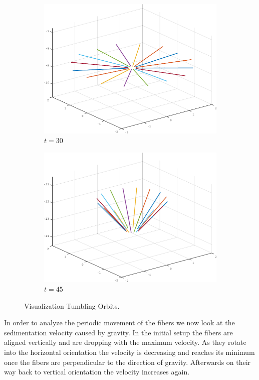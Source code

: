 \begin{figure}[!htbp]
\begin{subfigure}[h]{0.45\textwidth}
    \includegraphics[width=\textwidth]{img/ring_00030.pdf}
    \caption{$t=30$}\label{fig:ring_simulation_1c}
  \end{subfigure}
  \begin{subfigure}[h]{0.45\textwidth}
    \centering
    \includegraphics[width=\textwidth]{img/ring_00045.pdf}
    \caption{$t=45$}\label{fig:ring_simulation_1d}
  \end{subfigure}
  \caption{Visualization Tumbling Orbits.}
  \label{fig:ring_simulation}
\end{figure}

In order to analyze the periodic movement of the fibers we now look at the sedimentation velocity caused by gravity. In the initial setup the fibers are aligned vertically and are dropping with the maximum velocity. As they rotate into the horizontal orientation the velocity is decreasing and reaches its minimum once the fibers are perpendicular to the direction of gravity. Afterwards on their way back to vertical orientation the velocity increases again.

